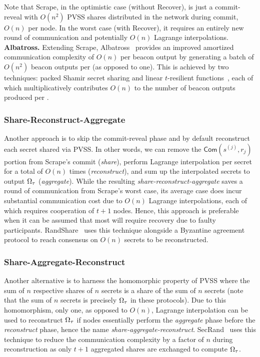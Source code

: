 Note that Scrape, in the optimistic case (without Recover), is just a commit-reveal with $O(n^2)$ PVSS shares distributed in the network during commit, $O(n)$ per node. In the worst case (with Recover), it requires an entirely new round of communication and potentially $O(n)$ Lagrange interpolations.\\

\noindent\textbf{Albatross.} Extending Scrape, Albatross~\cite{cascudo2020albatross} provides an improved amortized communication complexity of $O(n)$ per beacon output by generating a batch of $O(n^2)$ beacon outputs per \epoch (as opposed to one). This is achieved by two techniques: packed Shamir secret sharing and linear $t$-resilient functions~\cite{cascudo2020albatross}, each of which multiplicatively contributes $O(n)$ to the number of beacon outputs produced per \epoch.

\subsubsection{Share-Reconstruct-Aggregate}
Another approach is to skip the commit-reveal phase and by default reconstruct each secret shared via PVSS. In other words, we can remove the $\mathsf{Com}(s^{(j)}, r_j)$ portion from Scrape's commit (\textit{share}), perform Lagrange interpolation per secret for a total of $O(n)$ times (\textit{reconstruct}), and sum up the interpolated secrets to output $\Omega_\tau$ (\textit{aggregate}). While the resulting \textit{share-reconstruct-aggregate} saves a round of communication from Scrape's worst case, its average case does incur substantial communication cost due to $O(n)$ Lagrange interpolations, each of which requires cooperation of $t + 1$ nodes. Hence, this approach is preferable when it can be assumed that most \epochs will require recovery due to faulty participants. RandShare~\cite{syta2017scalable} uses this technique alongside a Byzantine agreement protocol to reach consensus on $O(n)$ secrets to be reconstructed.

\subsubsection{Share-Aggregate-Reconstruct}
Another alternative is to harness the homomorphic property of PVSS where the sum of $n$ respective shares of $n$ secrets is a share of the sum of $n$ secrets (note that the sum of $n$ secrets is precisely $\Omega_\tau$ in these protocols). Due to this homomorphism, only one, as opposed to $O(n)$, Lagrange interpolation can be used to reconstruct $\Omega_\tau$ if nodes essentially perform the \textit{aggregate} phase before the \textit{reconstruct} phase, hence the name \textit{share-aggregate-reconstruct}. SecRand~\cite{guo2020secRand} uses this technique to reduce the communication complexity by a factor of $n$ during reconstruction as only $t + 1$ aggregated shares are exchanged to compute $\Omega_\tau$.

